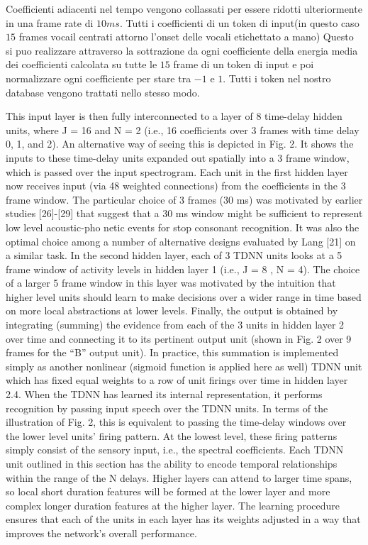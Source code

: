 Coefficienti adiacenti nel tempo vengono collassati per essere ridotti ulteriormente in una frame rate di $10ms$.
Tutti i coefficienti di un token di input(in questo caso $15$ frames vocail centrati attorno l'onset delle vocali etichettato a mano)
Questo si puo realizzare attraverso la sottrazione da ogni coefficiente della energia media dei coefficienti calcolata su tutte le $15$ frame di un token di input e poi normalizzare ogni coefficiente per stare tra $-1$ e $1$.
Tutti i token nel nostro database vengono trattati nello stesso modo.

This input layer is then fully interconnected to a layer of 8 time-delay hidden units, where J = 16 and N = 2 (i.e., 16 coefficients over 3 frames with time delay 0, 1, and 2). 
An alternative way of seeing this is depicted in Fig. 2. 
It shows the inputs to these time-delay units expanded out spatially into a 3 frame window, which is passed over the input spectrogram. 
Each unit in the first hidden layer now receives input (via 48 weighted connections) from the coefficients in the 3 frame window. 
The particular choice of 3 frames (30 ms) was motivated by earlier studies [26]-[29] that suggest that a 30 ms window might be sufficient to represent low level acoustic-pho netic events for stop consonant recognition. 
It was also the optimal choice among a number of alternative designs evaluated by Lang [21] on a similar task. 
In the second hidden layer, each of 3 TDNN units looks at a 5 frame window of activity levels in hidden layer 1 (i.e., J = 8 , N = 4). 
The choice of a larger 5 frame window in this layer was motivated by the intuition that higher level units should learn to make decisions over a wider range in time based on more local abstractions at lower levels.
Finally, the output is obtained by integrating (summing) the evidence from each of the 3 units in hidden layer 2 over time and connecting it to its pertinent output unit (shown in Fig. 2 over 9 frames for the “B” output unit). 
In practice, this summation is implemented simply as another nonlinear (sigmoid function is applied here as well) TDNN unit which has fixed equal weights to a row of unit firings over time in hidden layer 2.4.
When the TDNN has learned its internal representation, it performs recognition by passing input speech over the TDNN units.
In terms of the illustration of Fig. 2, this is equivalent to passing the time-delay windows over the lower level units’ firing pattern. 
At the lowest level, these firing patterns simply consist of the sensory input, i.e., the spectral coefficients.
Each TDNN unit outlined in this section has the ability to encode temporal relationships within the range of the N delays. 
Higher layers can attend to larger time spans, so local short duration features will be formed at the lower layer and more complex longer duration features at the higher layer. 
The learning procedure ensures that each of the units in each layer has its weights adjusted in a way that improves the network’s overall performance.




